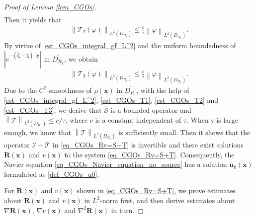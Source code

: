 \documentclass[11pt,reqno,oneside]{amsart}
\theoremstyle{definition}
\theoremstyle{remark}
\numberwithin{equation}{section}
\numberwithin{equation}{section}
\theoremstyle{remark}
\begin{document}
\begin{proof}[Proof of Lemma \ref{lem_CGOs}]
\begin{align}
	\end{align}
	Then it yields that 
	\begin{align} \label{est_CGOs_T2} 
		\left\| \mathcal{T}_2\left(\varphi\right) \right\|_{L^2\left(D_{R_1}\right)} \leqslant \frac{c}{\tau} \left\| \varphi \right\|_{L^2\left(D_{R_1}\right)}.
	\end{align}
	By virtue of \eqref{est_CGOs_integral_gf_L^2} and the uniform boundedness of $ \left| e^{-\left(\tilde{\bm{\zeta}}-\bm{\zeta}\right) \cdot \mathbf{y}} \right| $ in $ \overline{D_{R_1}} $, we obtain
	\begin{align} \label{est_CGOs_T3} 
		\left\| \mathcal{T}_3\left(\varphi\right) \right\|_{L^2\left(D_{R_1}\right)} \leqslant \frac{c}{\tau} \left\| \varphi \right\|_{L^2\left(D_{R_1}\right)}.
	\end{align}
	Due to the $ C^2 $-smoothness of $ \rho\left(\mathbf{x}\right) $ in $ \overline{D_{R_1}} $, with the help of \eqref{est_CGOs_integral_gf_L^2}, \eqref{est_CGOs_T1}, \eqref{est_CGOs_T2} and \eqref{est_CGOs_T3}, we derive that $ \mathcal{S} $ is a bounded operator and $ \left\| \mathcal{T} \right\|_{L^2\left(D_{R_1}\right)} \leqslant c/\tau $, where $ c $ is a constant independent of $ \tau $. When $ \tau $ is large enough, we know that $ \left\| \mathcal{T} \right\|_{L^2\left(D_{R_1}\right)} $ is sufficiently small. Then it shows that the operator $ \mathcal{I} - \mathcal{T} $ in \eqref{eq_CGOs_Rv=S+T} is invertible and there exist solutions $ \mathbf{R}\left(\mathbf{x}\right) $ and $ v\left(\mathbf{x}\right) $ to the system \eqref{eq_CGOs_Rv=S+T}. Consequently, the Navier equation \eqref{eq_CGOs_Navier_equation_no_source} has a solution $ \mathbf{u}_0\left(\mathbf{x}\right) $ formulated as \eqref{def_CGOs_u0}. 
	
	For $ \mathbf{R}\left(\mathbf{x}\right) $ and $ v\left(\mathbf{x}\right) $ shown in \eqref{eq_CGOs_Rv=S+T}, we prove estimates about $ \mathbf{R}\left(\mathbf{x}\right) $ and $ v\left(\mathbf{x}\right) $ in $ L^2 $-norm first, and then derive estimates about $ \nabla\mathbf{R}\left(\mathbf{x}\right) $, $ \nabla v\left(\mathbf{x}\right) $ and $ \nabla^2\mathbf{R}\left(\mathbf{x}\right) $ in turn. 
	 

\end{proof}
\end{document}
